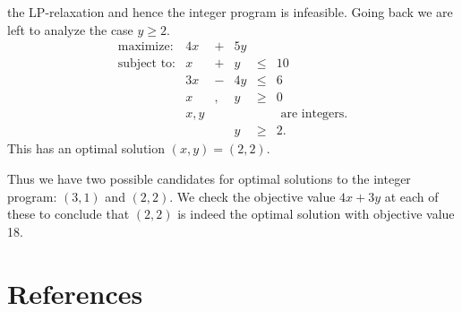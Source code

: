 \documentclass[
]{book}
\theoremstyle{definition}
\theoremstyle{definition}
\theoremstyle{definition}
\theoremstyle{definition}
\theoremstyle{remark}
\begin{document}
the LP-relaxation and hence the integer program is infeasible.
Going back we are left to analyze the case \(y \ge 2\).
\begin{equation*}
\begin{array}{llllll}
  \mbox{maximize:} & 4x & + & 5y \\ 
  \mbox{subject to:} 
  & x & + & y & \le & 10 \\
  & 3x & - & 4y & \le & 6 \\
  & x &, & y & \ge & 0 \\ 
  & x, y & & & & \mbox{ are integers.} \\
  & & & y & \ge & 2.
\end{array}
\end{equation*}
This has an optimal solution \((x, y) = (2, 2)\).

Thus we have two possible candidates for optimal solutions to the integer program: \((3, 1)\) and \((2, 2)\). We check the objective value \(4x + 3y\) at each of these to conclude that \((2, 2)\) is indeed the optimal solution with objective value 18.

\hypertarget{references}{%
\chapter*{References}\label{references}}


  

\printindex
\nocite{*}
\end{document}
